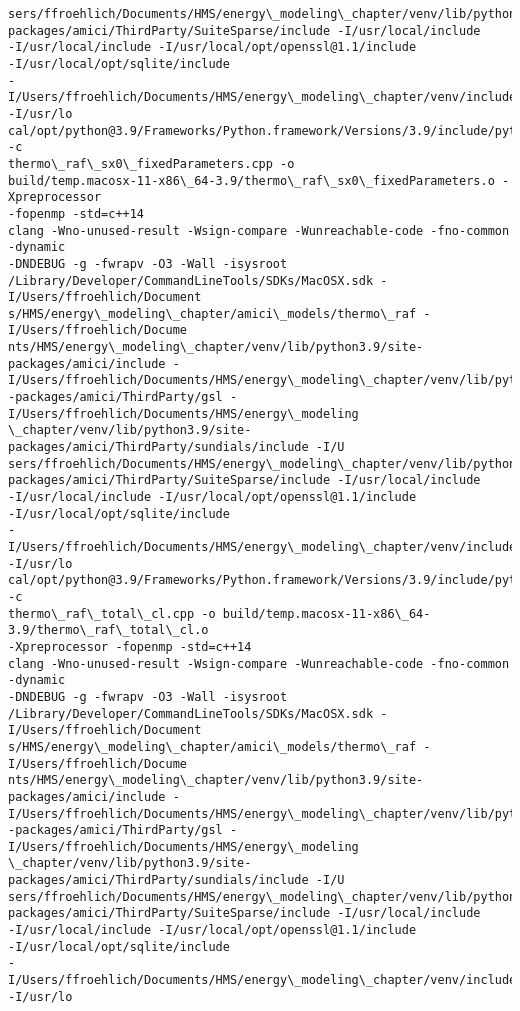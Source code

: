 \documentclass[11pt]{article}
\begin{document}
\begin{Verbatim}[commandchars=\\\{\}]
sers/ffroehlich/Documents/HMS/energy\_modeling\_chapter/venv/lib/python3.9/site-
packages/amici/ThirdParty/SuiteSparse/include -I/usr/local/include
-I/usr/local/include -I/usr/local/opt/openssl@1.1/include
-I/usr/local/opt/sqlite/include
-I/Users/ffroehlich/Documents/HMS/energy\_modeling\_chapter/venv/include -I/usr/lo
cal/opt/python@3.9/Frameworks/Python.framework/Versions/3.9/include/python3.9 -c
thermo\_raf\_sx0\_fixedParameters.cpp -o
build/temp.macosx-11-x86\_64-3.9/thermo\_raf\_sx0\_fixedParameters.o -Xpreprocessor
-fopenmp -std=c++14
clang -Wno-unused-result -Wsign-compare -Wunreachable-code -fno-common -dynamic
-DNDEBUG -g -fwrapv -O3 -Wall -isysroot
/Library/Developer/CommandLineTools/SDKs/MacOSX.sdk -I/Users/ffroehlich/Document
s/HMS/energy\_modeling\_chapter/amici\_models/thermo\_raf -I/Users/ffroehlich/Docume
nts/HMS/energy\_modeling\_chapter/venv/lib/python3.9/site-packages/amici/include -
I/Users/ffroehlich/Documents/HMS/energy\_modeling\_chapter/venv/lib/python3.9/site
-packages/amici/ThirdParty/gsl -I/Users/ffroehlich/Documents/HMS/energy\_modeling
\_chapter/venv/lib/python3.9/site-packages/amici/ThirdParty/sundials/include -I/U
sers/ffroehlich/Documents/HMS/energy\_modeling\_chapter/venv/lib/python3.9/site-
packages/amici/ThirdParty/SuiteSparse/include -I/usr/local/include
-I/usr/local/include -I/usr/local/opt/openssl@1.1/include
-I/usr/local/opt/sqlite/include
-I/Users/ffroehlich/Documents/HMS/energy\_modeling\_chapter/venv/include -I/usr/lo
cal/opt/python@3.9/Frameworks/Python.framework/Versions/3.9/include/python3.9 -c
thermo\_raf\_total\_cl.cpp -o build/temp.macosx-11-x86\_64-3.9/thermo\_raf\_total\_cl.o
-Xpreprocessor -fopenmp -std=c++14
clang -Wno-unused-result -Wsign-compare -Wunreachable-code -fno-common -dynamic
-DNDEBUG -g -fwrapv -O3 -Wall -isysroot
/Library/Developer/CommandLineTools/SDKs/MacOSX.sdk -I/Users/ffroehlich/Document
s/HMS/energy\_modeling\_chapter/amici\_models/thermo\_raf -I/Users/ffroehlich/Docume
nts/HMS/energy\_modeling\_chapter/venv/lib/python3.9/site-packages/amici/include -
I/Users/ffroehlich/Documents/HMS/energy\_modeling\_chapter/venv/lib/python3.9/site
-packages/amici/ThirdParty/gsl -I/Users/ffroehlich/Documents/HMS/energy\_modeling
\_chapter/venv/lib/python3.9/site-packages/amici/ThirdParty/sundials/include -I/U
sers/ffroehlich/Documents/HMS/energy\_modeling\_chapter/venv/lib/python3.9/site-
packages/amici/ThirdParty/SuiteSparse/include -I/usr/local/include
-I/usr/local/include -I/usr/local/opt/openssl@1.1/include
-I/usr/local/opt/sqlite/include
-I/Users/ffroehlich/Documents/HMS/energy\_modeling\_chapter/venv/include -I/usr/lo

\end{Verbatim}
\end{document}
